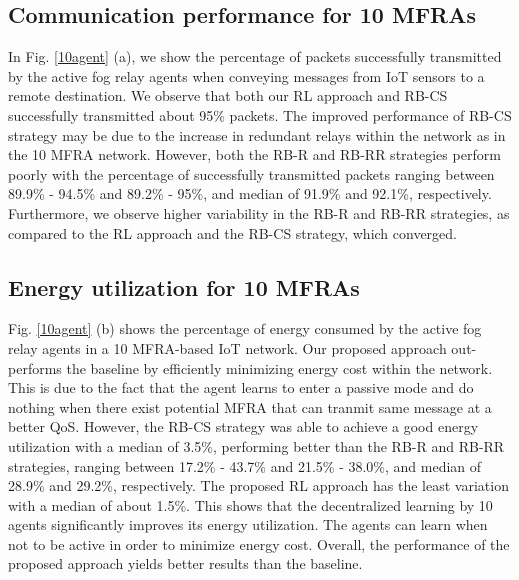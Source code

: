 \documentclass[journal]{IEEEtran}
\begin{document}
\subsection{Communication performance for 10 MFRAs}
In Fig. \ref{10agent} (a), we show the percentage of packets successfully transmitted by the active fog relay agents when conveying messages from IoT sensors to a remote destination. We observe that both our RL approach and RB-CS successfully transmitted about 95\% packets. The improved performance of RB-CS strategy may be due to the increase in redundant relays within the network as in the 10 MFRA network. However, both the RB-R and RB-RR strategies perform poorly with the percentage of successfully transmitted packets ranging between 89.9\% - 94.5\% and 89.2\% - 95\%, and median of 91.9\% and 92.1\%, respectively. Furthermore, we observe higher variability in the RB-R and RB-RR strategies, as compared to the RL approach and the RB-CS strategy, which converged.

\subsection{Energy utilization for 10 MFRAs}
Fig. \ref{10agent} (b) shows the percentage of energy consumed by the active fog relay agents in a 10 MFRA-based IoT network. Our proposed approach out-performs the baseline by efficiently minimizing energy cost within the network. This is due to the fact that the agent learns to enter a passive mode and do nothing when there exist potential MFRA that can tranmit same message at a better QoS. However, the RB-CS strategy was able to achieve a good energy utilization with a median of 3.5\%, performing better than the RB-R and RB-RR strategies, ranging between 17.2\% - 43.7\% and 21.5\% - 38.0\%, and median of 28.9\% and 29.2\%, respectively. The proposed RL approach has the least variation with a median of about 1.5\%. This shows that the decentralized learning by 10 agents significantly improves its energy utilization. The agents can learn when not to be active in order to minimize energy cost. Overall, the performance of the proposed approach yields better results than the baseline.
\end{document}
